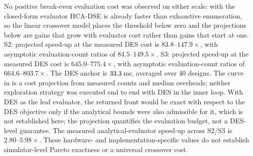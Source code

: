 %
No positive break-even evaluation cost was observed on either scale: with the closed-form evaluator HCA-DSE is already faster than exhaustive enumeration, so the linear crossover model places the threshold below zero and the projections below are gains that grow with evaluator cost rather than gains that start at one.
S2: projected speed-up at the measured DES cost is $83.8\text{--}147.9\times$, with asymptotic evaluation-count ratios of $84.5\text{--}149.5\times$.
S3: projected speed-up at the measured DES cost is $645.0\text{--}775.4\times$, with asymptotic evaluation-count ratios of $664.6\text{--}803.7\times$. The DES anchor is $33.3$\,ms, averaged over 40 designs. The curve in
\RefCrossoverFig{} is a cost projection from measured counts and median overheads;
neither exploration strategy was executed end to end with DES in the inner loop. With DES as the leaf evaluator, the returned front would be exact with respect to the DES objective only if the analytical bounds were also admissible for it, which is not established here; the projection quantifies the evaluation budget, not a DES-level guarantee.
The measured analytical-evaluator speed-up across S2/S3 is $2.80\text{--}5.98\times$. These hardware- and implementation-specific values do not establish
simulator-level Pareto exactness or a universal crossover cost.
